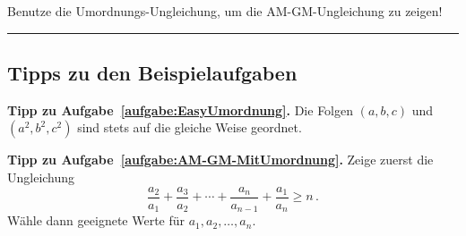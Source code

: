 \begin{aufgabe*}[*]\label{aufgabe:AM-GM-MitUmordnung}
	Benutze die Umordnungs-Ungleichung, um die AM-GM-Ungleichung zu zeigen!
\end{aufgabe*}

\vfill\hrule\vspace{-1em}

\subsection*{Tipps zu den Beispielaufgaben}
\textbf{Tipp zu Aufgabe~\ref{aufgabe:EasyUmordnung}.} Die Folgen $(a,b,c)$ und $(a^2,b^2,c^2)$ sind stets auf die gleiche Weise geordnet.

\textbf{Tipp zu Aufgabe~\ref{aufgabe:AM-GM-MitUmordnung}.} Zeige zuerst die Ungleichung
\begin{equation*}
	\frac{a_2}{a_1}+\frac{a_3}{a_2}+\dotsb+\frac{a_n}{a_{n-1}}+\frac{a_1}{a_n}\geqslant n\,.
\end{equation*}
Wähle dann geeignete Werte für $a_1,a_2,\dotsc,a_n$.